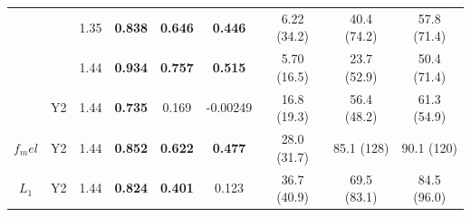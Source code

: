 \begin{subappendices}
\begin{table}[htb!]
\begin{tabular}{|ccc|ccc|ccc|}
        & & 1.35 & \textbf{0.838} & \textbf{0.646} & \textbf{0.446} & 6.22 (34.2) & 40.4 (74.2) & 57.8 (71.4) \\
        & & 1.44 & \textbf{0.934} & \textbf{0.757} & \textbf{0.515} & 5.70 (16.5) & 23.7 (52.9) & 50.4 (71.4) \\
        \cline{2-9}
        & Y2 & 1.44 & \textbf{0.735} & 0.169 & -0.00249 & 16.8 (19.3) & 56.4 (48.2) & 61.3 (54.9) \\
        \hline
        $f_mel$ & Y2 & 1.44 & \textbf{0.852} & \textbf{0.622} & \textbf{0.477} & 28.0 (31.7) & 85.1 (128) & 90.1 (120) \\
        \hline
        $L_1$ & Y2 & 1.44 & \textbf{0.824} & \textbf{0.401} & 0.123 & 36.7 (40.9) & 69.5 (83.1) & 84.5 (96.0) \\
        \hline
    \end{tabular}    
    \label{ap:backwardsHSIMCq}
\end{table}


\end{subappendices}
